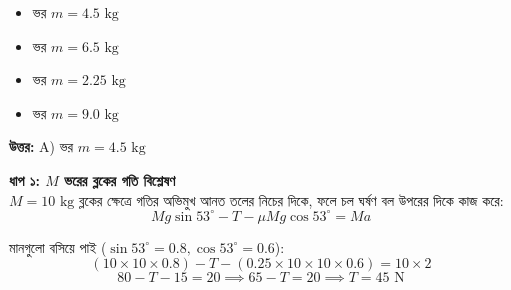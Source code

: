 \documentclass[12pt, a4paper]{article}
\begin{document}
{{\begin{center}
\end{center}
\vspace{1em}

\begin{itemize}[label={}, leftmargin=1cm, itemsep=0.5em]
    \item[\textbf{A)}] ভর $m = 4.5\text{ kg}$
    \item[\textbf{B)}] ভর $m = 6.5\text{ kg}$
    \item[\textbf{C)}] ভর $m = 2.25\text{ kg}$
    \item[\textbf{D)}] ভর $m = 9.0\text{ kg}$
\end{itemize}

\vspace{0.5em}
\begin{tcolorbox}[answerbox]
    \textbf{\color{success} উত্তর:} A) ভর $m = 4.5\text{ kg}$
\end{tcolorbox}
\vspace{1em}

\begin{tcolorbox}[solutionbox={সমাধান (Solution)}]
    \noindent
    \textbf{ধাপ ১: $M$ ভরের ব্লকের গতি বিশ্লেষণ} \\
    $M = 10\text{ kg}$ ব্লকের ক্ষেত্রে গতির অভিমুখ আনত তলের নিচের দিকে, ফলে চল ঘর্ষণ বল উপরের দিকে কাজ করে:
    \[ Mg \sin 53^\circ - T - \mu Mg \cos 53^\circ = M a \]
    
    মানগুলো বসিয়ে পাই ($\sin 53^\circ = 0.8, \cos 53^\circ = 0.6$):
    \[ (10 \times 10 \times 0.8) - T - (0.25 \times 10 \times 10 \times 0.6) = 10 \times 2 \]
    \[ 80 - T - 15 = 20 \implies 65 - T = 20 \implies T = 45\text{ N} \]
    

\end{tcolorbox}}}
\end{document}
